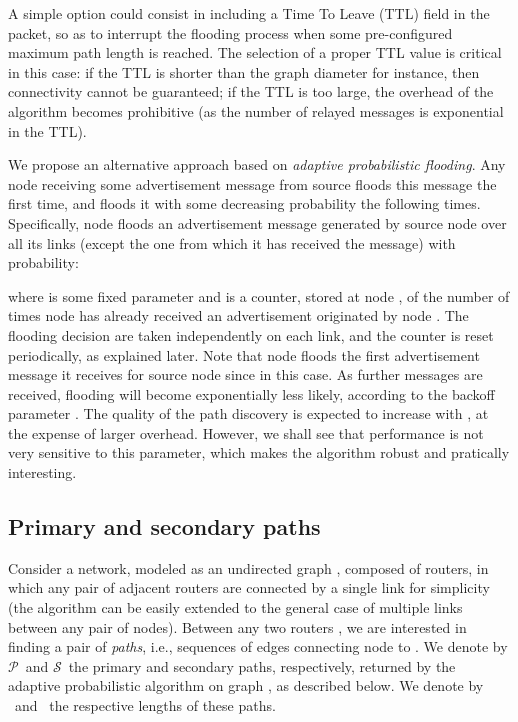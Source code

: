 \documentclass[conference]{IEEEtran}
\newcommand{\PA}{\ensuremath{\mathcal{P}}}
\newcommand{\SE}{\ensuremath{\mathcal{S}}}
\begin{document}
A simple option could consist in including a Time To Leave (TTL) field in the packet, so as to   interrupt the flooding process when some pre-configured maximum path length is reached.  The selection of a proper TTL value is  critical in this case: if the TTL is shorter than the graph diameter  for instance, then connectivity cannot be guaranteed; if the TTL is too large, the overhead of the algorithm becomes prohibitive (as the number of relayed messages is exponential in the TTL).

We propose an alternative approach based on {\it adaptive probabilistic flooding}. Any node receiving some advertisement message from source  floods this message the first time, and floods it with some decreasing probability the following times. Specifically,  node  floods an advertisement message generated by source node  over all its links  (except the one from which  it has received the message) with probability:

where  is some fixed parameter and  is a counter, stored at node , of the number of times node  has already received an advertisement originated by node . The flooding decision are taken independently on each link, and the counter is reset periodically, as explained later. 
Note that node   floods the first advertisement message it receives for source node  since   in this case. As further messages are received, flooding will become exponentially less likely, according to the backoff parameter . 
The quality of the path discovery is expected to increase with , at the expense of larger overhead. 
However, we shall see that performance is not very sensitive to this parameter, which makes the algorithm robust and pratically interesting. 


\subsection{Primary and secondary paths}
Consider a network, modeled as an undirected graph , composed of  routers, in which any pair of adjacent routers are connected by a single link for simplicity (the algorithm can be easily extended to  the general case of multiple links between any pair of nodes). Between any two routers , we are interested in finding a pair of \emph{paths}, i.e., sequences of edges 
connecting node  to .  We denote by  \PA\ and \SE\ the primary and secondary paths, respectively, returned by the adaptive probabilistic algorithm on graph , as described below. 
We denote by \lenP\ and \lenS\ the respective lengths of these paths.
  
\end{document}
